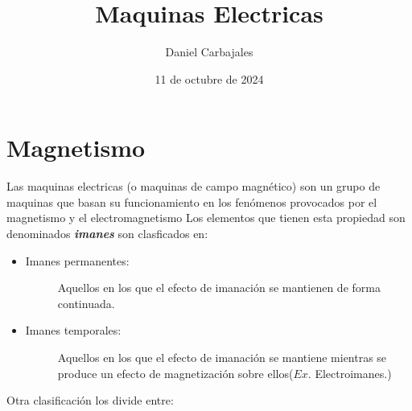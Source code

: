 \documentclass{report}
\title{\Huge{Maquinas Electricas}}
\author{\large{Daniel Carbajales}}
\date{11 de octubre de 2024}
\begin{document}
 \maketitle
 \newpage

 \tableofcontents
 
\label{chap:1}
  \section{Magnetismo }\label{sec:magnetismo}

 Las maquinas electricas (o maquinas de campo magnético) son un grupo de maquinas que basan su funcionamiento
 en los fenómenos provocados por el magnetismo y el electromagnetismo 
 Los elementos que tienen esta propiedad son denominados \textbf\emph{imanes} son clasficados en:
 \begin{itemize}
   \item\begin{description}
       \item[Imanes permanentes:] Aquellos en los que el efecto de imanación se mantienen de forma continuada.
    \end{description}
  \item\begin{description}
      \item[Imanes temporales:] Aquellos en los que el efecto de imanación se mantiene mientras se produce un efecto de magnetización sobre ellos(\(Ex.\) Electroimanes.)
      \end{description}
 \end{itemize}
 Otra clasificación los divide entre:
\end{document}

